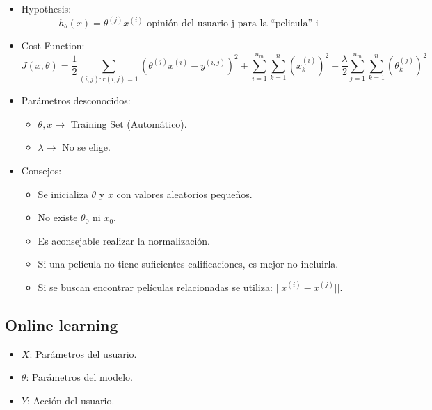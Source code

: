 \documentclass[12pt,a4paper]{article}
\begin{document}
\begin{itemize}
\item Hypothesis: 
\begin{equation*}
h_{\theta}(x)= \theta^{(j)} x^{(i)} \mbox{ opinión del usuario j para la ``pelicula'' i}
\end{equation*}
\item Cost Function:
\begin{equation*}
J(x,\theta) = \dfrac{1}{2} \sum_{(i,j):r(i,j)=1} (\theta^{(j)} x^{(i)}-y^{(i,j)})^2 + \sum_{i=1}^{n_m} \sum_{k=1}^{n} (x_{k}^{(i)})^2 + \dfrac{\lambda}{2} \sum_{j=1}^{n_m} \sum_{k=1}^{n} (\theta_k^{(j)})^2 
\end{equation*}

\item Parámetros desconocidos:
\begin{itemize}
\item $\theta, x \longrightarrow$ Training Set (Automático).
\item $\lambda \longrightarrow$ No se elige.
\end{itemize}
\item Consejos:
\begin{itemize}
\item Se inicializa $\theta$ y $x$ con valores aleatorios pequeños.
\item No existe $\theta_0$ ni $x_0$.
\item Es aconsejable realizar la normalización.
\item Si una película no tiene suficientes calificaciones, es mejor no incluirla.
\item Si se buscan encontrar películas relacionadas se utiliza: $|| x^{(i)} - x^{(j)} ||$.
\end{itemize}
\end{itemize}





\subsection{Online learning}
\begin{itemize}
\item $X$: Parámetros del usuario.
\item $\theta$: Parámetros del modelo.
\item $Y$: Acción del usuario.
\end{itemize}
\end{document}
